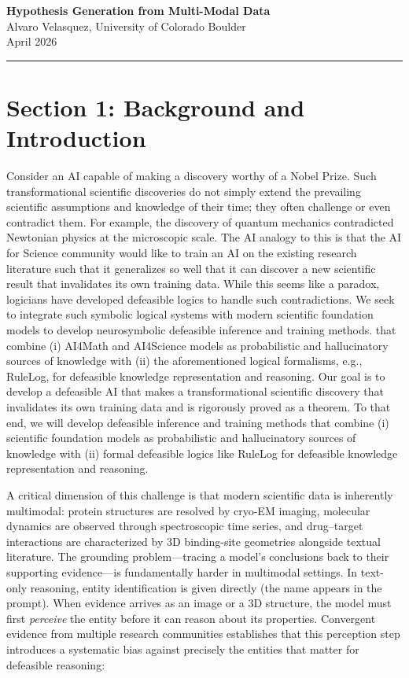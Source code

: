 \documentclass[11pt]{article}
\begin{document}
\begin{center}
{\Large\bfseries Hypothesis Generation from Multi-Modal Data}\\[4pt]
{\normalsize Alvaro Velasquez, University of Colorado Boulder}\\[2pt]
{\small April 2026}
\end{center}

\vspace{-4pt}
\hrule
\vspace{6pt}

\section*{Section 1: Background and Introduction}

Consider an AI capable of making a discovery worthy of a Nobel Prize. Such transformational scientific discoveries do not simply extend the prevailing scientific assumptions and knowledge of their time; they often challenge or even contradict them. For example, the discovery of quantum mechanics contradicted Newtonian physics at the microscopic scale. The AI analogy to this is that the AI for Science community would like to train an AI on the existing research literature such that it generalizes so well that it can discover a new scientific result that invalidates its own training data. While this seems like a paradox, logicians have developed defeasible logics to handle such contradictions. We seek to integrate such symbolic logical systems with modern scientific foundation models to develop neurosymbolic defeasible inference and training methods. that combine (i) AI4Math and AI4Science models as probabilistic and hallucinatory sources of knowledge with (ii) the aforementioned logical formalisms, e.g., RuleLog, for defeasible knowledge representation and reasoning. Our goal is to develop a defeasible AI that makes a transformational scientific discovery that invalidates its own training data and is rigorously proved as a theorem. To that end, we will develop defeasible inference and training  methods that combine (i) scientific foundation models as probabilistic and hallucinatory sources of knowledge with (ii) formal defeasible logics like RuleLog for defeasible knowledge representation and reasoning.

A critical dimension of this challenge is that modern scientific data is inherently multimodal: protein structures are resolved by cryo-EM imaging, molecular dynamics are observed through spectroscopic time series, and drug--target interactions are characterized by 3D binding-site geometries alongside textual literature. The grounding problem---tracing a model's conclusions back to their supporting evidence---is fundamentally harder in multimodal settings. In text-only reasoning, entity identification is given directly (the name appears in the prompt). When evidence arrives as an image or a 3D structure, the model must first \emph{perceive} the entity before it can reason about its properties. Convergent evidence from multiple research communities establishes that this perception step introduces a systematic bias against precisely the entities that matter for defeasible reasoning:
\end{document}
